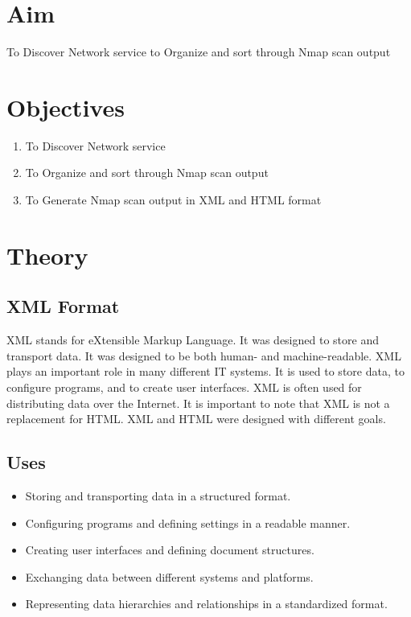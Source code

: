 \documentclass[11pt]{article}
\begin{document}
\tableofcontents
\thispagestyle{empty}
\clearpage

\setcounter{page}{1}

\section{Aim}
To Discover Network service to Organize and sort through Nmap scan output
\section{Objectives}
\begin{enumerate}
    \item To Discover Network service
    \item To Organize and sort through Nmap scan output
    \item To Generate Nmap scan output in XML and HTML format
\end{enumerate}

\section{Theory}

\subsection{XML Format}
XML stands for eXtensible Markup Language. It was designed to store and transport data. It was designed to be both human- and machine-readable. XML plays an important role in many different IT systems. It is used to store data, to configure programs, and to create user interfaces. XML is often used for distributing data over the Internet. It is important to note that XML is not a replacement for HTML. XML and HTML were designed with different goals.

\subsection{Uses}
\begin{itemize}
    \item Storing and transporting data in a structured format.
    \item Configuring programs and defining settings in a readable manner.
    \item Creating user interfaces and defining document structures.
    \item Exchanging data between different systems and platforms.
    \item Representing data hierarchies and relationships in a standardized format.
\end{itemize}
\end{document}
